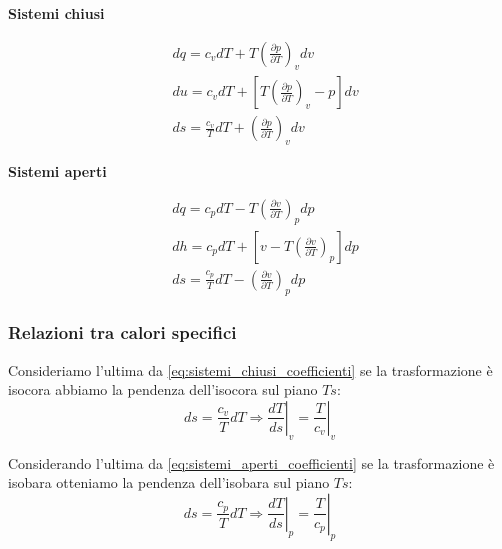 \documentclass[a4paper]{article}
\numberwithin{equation}{section}%
\begin{document}
\begin{multicols}{2}
	\begin{center}
\textbf{Sistemi chiusi}
	\end{center}

\begin{equation}
\begin{aligned}
	&d q=c_{v} d T+T\left(\frac{\partial p}{\partial T}\right)_{v} d v \\
	&d u=c_{v} d T+\left[T\left(\frac{\partial p}{\partial T}\right)_{v}-p\right] d v \\
	&d s=\frac{c_{v}}{T} d T+\left(\frac{\partial p}{\partial T}\right)_{v} d v
\end{aligned}
	\label{eq:sistemi_chiusi_coefficienti}
\end{equation}


\begin{center}
\textbf{Sistemi aperti}
\end{center}
\begin{equation}
\begin{aligned}
	&d q=c_{p} d T-T\left(\frac{\partial v}{\partial T}\right)_{p} d p \\
	&d h=c_{p} d T+\left[v-T\left(\frac{\partial v}{\partial T}\right)_{p}\right] d p \\
	&d s=\frac{c_{p}}{T} d T-\left(\frac{\partial v}{\partial T}\right)_{p} d p 
\end{aligned}
\label{eq:sistemi_aperti_coefficienti}
\end{equation}




\end{multicols}

\subsubsection{Relazioni tra calori specifici}\label{relazioni_cv_cp}

 Consideriamo l'ultima da \eqref{eq:sistemi_chiusi_coefficienti} se la trasformazione è isocora abbiamo la pendenza dell'isocora sul piano $Ts$:
 \begin{equation}
d s=\left.\frac{c_{v}}{T} d T \Rightarrow \frac{d T}{d s}\right|_{v}=\left.\frac{T}{c_{v}}\right|_{v}
 \end{equation}

Considerando  l'ultima da \eqref{eq:sistemi_aperti_coefficienti} se la trasformazione è isobara otteniamo la pendenza dell'isobara sul piano $Ts$:
\begin{equation}
d s=\left.\frac{c_{p}}{T} d T \Rightarrow \frac{d T}{d s}\right|_{p}=\left.\frac{T}{c_{p}}\right|_{p}
\end{equation}
\end{document}
